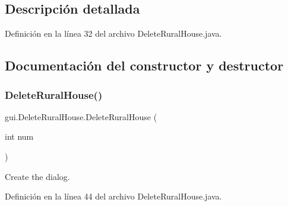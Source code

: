 \subsection{Descripción detallada}


Definición en la línea 32 del archivo Delete\+Rural\+House.\+java.



\subsection{Documentación del constructor y destructor}
\mbox{\label{classgui_1_1_delete_rural_house_a0de5d3d33aae7cd4d03aedd0f0fdf6c5}} 
\subsubsection{\texorpdfstring{DeleteRuralHouse()}{DeleteRuralHouse()}}
{\footnotesize\ttfamily gui.\+Delete\+Rural\+House.\+Delete\+Rural\+House (\begin{DoxyParamCaption}\item[{int}]{num }\end{DoxyParamCaption})}



Create the dialog. 



Definición en la línea 44 del archivo Delete\+Rural\+House.\+java.


